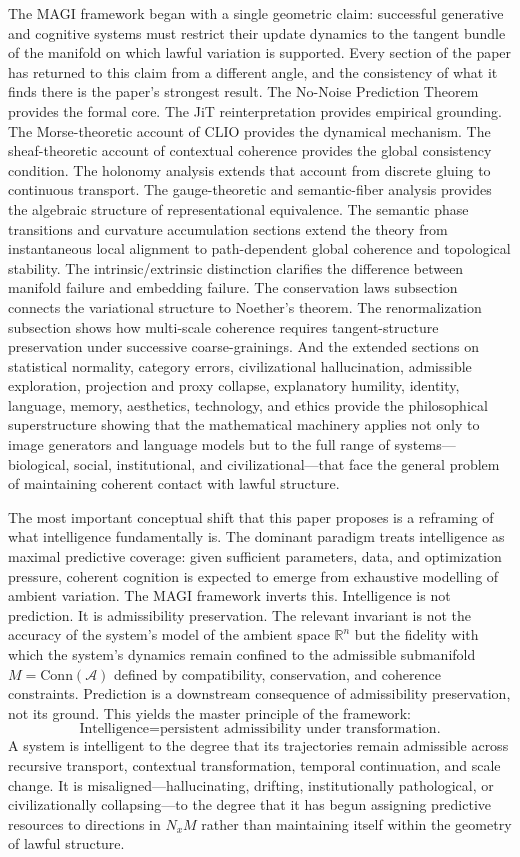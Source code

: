 \documentclass[11pt,a4paper,twocolumn]{article}
\begin{document}
The MAGI framework began with a single geometric claim: successful
generative and cognitive systems must restrict their update dynamics
to the tangent bundle of the manifold on which lawful variation is
supported. Every section of the paper has returned to this claim
from a different angle, and the consistency of what it finds there
is the paper's strongest result. The No-Noise Prediction Theorem
provides the formal core. The JiT reinterpretation provides
empirical grounding. The Morse-theoretic account of CLIO provides
the dynamical mechanism. The sheaf-theoretic account of contextual
coherence provides the global consistency condition. The holonomy
analysis extends that account from discrete gluing to continuous
transport. The gauge-theoretic and semantic-fiber analysis provides
the algebraic structure of representational equivalence. The
semantic phase transitions and curvature accumulation sections
extend the theory from instantaneous local alignment to
path-dependent global coherence and topological stability. The
intrinsic/extrinsic distinction clarifies the difference between
manifold failure and embedding failure. The conservation laws
subsection connects the variational structure to Noether's theorem.
The renormalization subsection shows how multi-scale coherence
requires tangent-structure preservation under successive
coarse-grainings. And the extended sections on statistical
normality, category errors, civilizational hallucination,
admissible exploration, projection and proxy collapse, explanatory
humility, identity, language, memory, aesthetics, technology,
and ethics provide the philosophical superstructure showing that
the mathematical machinery applies not only to image generators
and language models but to the full range of systems---biological,
social, institutional, and civilizational---that face the general
problem of maintaining coherent contact with lawful structure.

The most important conceptual shift that this paper proposes is a
reframing of what intelligence fundamentally is. The dominant
paradigm treats intelligence as maximal predictive coverage:
given sufficient parameters, data, and optimization pressure,
coherent cognition is expected to emerge from exhaustive modelling
of ambient variation. The MAGI framework inverts this. Intelligence
is not prediction. It is admissibility preservation. The relevant
invariant is not the accuracy of the system's model of the ambient
space $\mathbb{R}^n$ but the fidelity with which the system's
dynamics remain confined to the admissible submanifold
$M = \mathrm{Conn}(\mathcal{A})$ defined by compatibility,
conservation, and coherence constraints. Prediction is a
downstream consequence of admissibility preservation, not its
ground. This yields the master principle of the framework:
\[
\text{Intelligence}
=
\text{persistent admissibility under transformation.}
\]
A system is intelligent to the degree that its trajectories
remain admissible across recursive transport, contextual
transformation, temporal continuation, and scale change. It
is misaligned---hallucinating, drifting, institutionally
pathological, or civilizationally collapsing---to the degree
that it has begun assigning predictive resources to directions
in $N_x M$ rather than maintaining itself within the
geometry of lawful structure.
\end{document}
